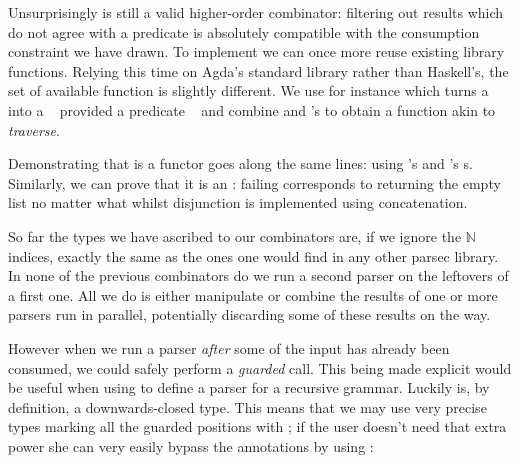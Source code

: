
Unsurprisingly  is still a valid higher-order combinator:
filtering out results which do not agree with a predicate is absolutely
compatible with the consumption constraint we have drawn. To implement
 we can once more reuse existing library functions. Relying
this time on Agda's standard library rather than Haskell's, the set of
available function is slightly different. We use for instance 
which turns a \mbox{ } into a \mbox{ }
provided a predicate \mbox{   } and combine
 and 's  to obtain a function akin to
\textit{traverse}.


Demonstrating that  is a functor goes along the same
lines: using 's and 's s. Similarly,
we can prove that it is an : failing corresponds
to returning the empty list no matter what whilst disjunction is
implemented using concatenation.

\begin{minipage}{0.30\textwidth}
\end{minipage}
\begin{minipage}{0.55\textwidth}
\end{minipage}

So far the types we have ascribed to our combinators are, if we ignore
the $\mathbb{N}$ indices, exactly the
same as the ones one would find in any other parsec library. In none
of the previous combinators do we run a second parser on the leftovers
of a first one. All we do is either manipulate or combine the results
of one or more parsers run in parallel, potentially discarding some of
these results on the way.

However when we run a parser \emph{after} some of the input has already
been consumed, we could safely perform a \emph{guarded} call. This being
made explicit would be useful when using  to define a parser for
a recursive grammar. Luckily  is, by definition, a
downwards-closed type. This means that we may use very precise types marking
all the guarded positions with \BOX{}; if the user doesn't need that extra
power she can very easily bypass the \BOX{} annotations by using :


